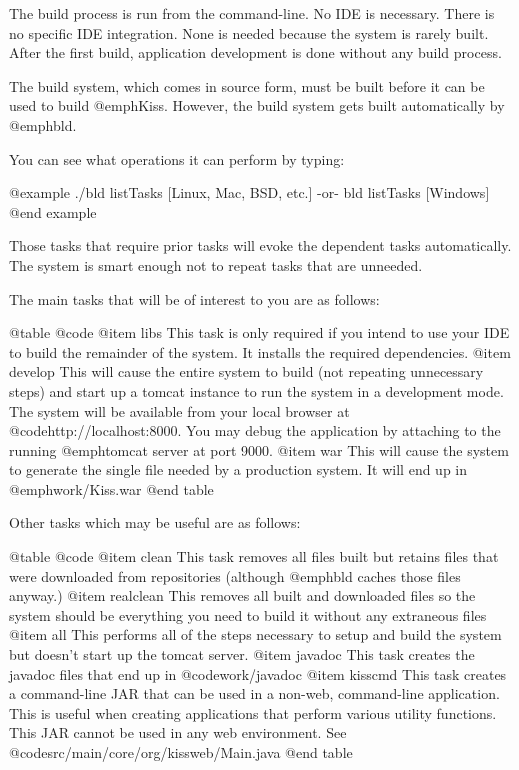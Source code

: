 The build process is run from the command-line.  No IDE is necessary.
There is no specific IDE integration.  None is needed because the system
is rarely built.  After the first build, application development is done
without any build process.

The build system, which comes in source form, must be built before it
can be used to build @emph{Kiss}.  However, the build system gets built
automatically by @emph{bld}.

You can see what operations it can perform by typing:

@example
    ./bld listTasks           [Linux, Mac, BSD, etc.]
        -or-
    bld listTasks             [Windows]
@end example

Those tasks that require prior tasks will evoke the dependent tasks
automatically.  The system is smart enough not to repeat tasks that
are unneeded.

The main tasks that will be of interest to you are as follows:

@table @code
@item libs
This task is only required if you intend to use your IDE to build the
remainder of the system.  It installs the required dependencies.
@item develop
This will cause the entire system to build (not repeating unnecessary
steps) and start up a tomcat instance to run the system in a
development mode.  The system will be available from your local
browser at @code{http://localhost:8000}.  You may debug the
application by attaching to the running @emph{tomcat} server at port
9000.
@item war
This will cause the system to generate the single file needed by a
production system.  It will end up in @emph{work/Kiss.war}
@end table

Other tasks which may be useful are as follows:

@table @code
@item clean
This task removes all files built but retains files that were downloaded from
repositories (although @emph{bld} caches those files anyway.)
@item realclean
This removes all built and downloaded files so the system should be everything
you need to build it without any extraneous files
@item all
This performs all of the steps necessary to setup and build the system but
doesn't start up the tomcat server.
@item javadoc
This task creates the javadoc files that end up in @code{work/javadoc}
@item kisscmd
This task creates a command-line JAR that can be used in a non-web, command-line application.
This is useful when creating applications that perform various utility functions.  This
JAR cannot be used in any web environment.  See @code{src/main/core/org/kissweb/Main.java}
@end table


